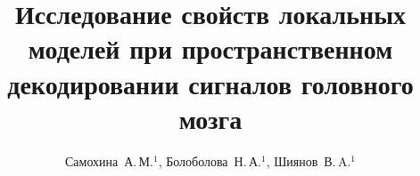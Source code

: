 \documentclass[12pt,twoside]{article}
\title
    [Исследование свойств локальных моделей при пространственном декодировании сигналов головного мозга] 
    {Исследование свойств локальных моделей при пространственном декодировании сигналов головного мозга}
\author
    [Самохина~А.\,М.] %
    {Самохина~А.\,М.$^1$, Болоболова~Н.\,А.$^1$, Шиянов~В.\,A.$^1$} %
\begin{document}
\maketitle
\bigskip
\bigskip
\bigskip
\bigskip
\maketitleSecondary
\end{document}

